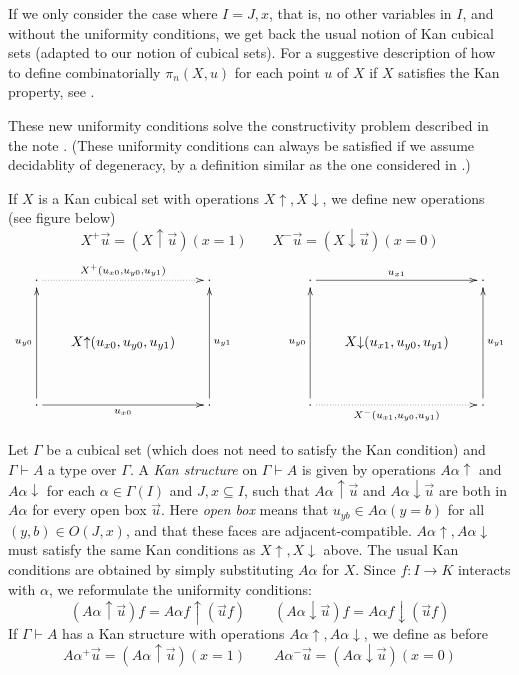 \documentclass[10pt,a4paper]{article}
\newcommand{\rup}[1]{#1{\uparrow}}
\newcommand{\rdo}[1]{#1{\downarrow}}
\begin{document}
If we only consider the case where $I = J,x$, that is, no other
variables in $I$, and without the uniformity conditions, we get back
the usual notion of Kan cubical sets \cite[Section 4]{Kan} (adapted to
our notion of cubical sets).  For a suggestive description of how to
define combinatorially $\pi_n(X,u)$ for each point $u$ of $X$ if $X$
satisfies the Kan property, see \cite{Williamson}.

These new uniformity conditions solve the constructivity problem
described in the note \cite{BC}.  (These uniformity conditions can
always be satisfied if we assume decidablity of degeneracy, by a
definition similar as the one considered in \cite{BCH}.)

If $X$ is a Kan cubical set with operations $\rup{X},\rdo{X}$, we
define new operations (see figure below)
$$
X^+\vec u = (\rup{X} \vec u)(x=1)~~~~~~~~X^-\vec u = (\rdo{X} \vec
u)(x=0)$$
\def\noe{\cdot}
\[
\xymatrix@R=1.1cm@C=.6cm{
\noe\ar@{.>}[rr]^{X^+(u_{x0}, u_{y0},u_{y1})}&      & \noe                                     &&&
\noe\ar[rr]^{u_{x1}}                                 &      & \noe      \\
                                      &\rup{X}(u_{x0}, u_{y0},u_{y1})&                          &&&
                                      &\rdo{X}(u_{x1}, u_{y0},u_{y1})&                              \\
\noe\ar[rr]_{u_{x0}}\ar[uu]^{u_{y0}}&      & \noe\ar[uu]_{u_{y1}}                                     &&&
\noe\ar@{.>}[rr]_{X^-(u_{x1}, u_{y0},u_{y1})}\ar[uu]^{u_{y0}}     &      & \noe\ar[uu]_{u_{y1}}                       \\
}
\]


Let $\Gamma$ be a cubical set (which does not need to satisfy the Kan
condition) and $\Gamma\vdash A$ a type over $\Gamma$.  A \emph{Kan
  structure} on $\Gamma \vdash A$ is given by operations $\rup{A
  \alpha}$ and $\rdo{A \alpha}$ for each $\alpha\in\Gamma(I)$ and
$J,x\subseteq I$, such that $\rup{A\alpha} \vec u$ and $\rdo{A\alpha}
\vec u$ are both in $A\alpha$ for every open box $\vec u$.  Here
\emph{open box} means that $u_{yb}\in A\alpha(y=b)$ for all $(y,b)\in
O(J,x)$, and that these faces are adjacent-compatible.
$\rup{A\alpha}, \rdo{A\alpha}$ must satisfy the same Kan conditions as
$ \rup{X},\rdo{X}$ above.  The usual Kan conditions are obtained by
simply substituting $A\alpha$ for $X$.  Since $f:I\to K$ interacts
with $\alpha$, we reformulate the uniformity conditions:
\[
(\rup{A\alpha} \vec u)f = \rup{A\alpha f} (\vec{u}f) \qquad
(\rdo{A\alpha} \vec u)f = \rdo{A\alpha f} (\vec{u}f)
\]
If $\Gamma\vdash A$ has a Kan structure with operations
$\rup{A\alpha},\rdo{A\alpha}$, we define as before
\[
A\alpha^+\vec u = (\rup{A\alpha} \vec u)(x=1) \qquad
A\alpha^-\vec u = (\rdo{A\alpha} \vec u)(x=0)
\]
\end{document}
